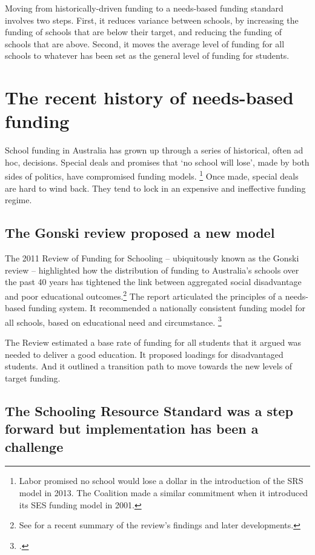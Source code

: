 \documentclass{grattan}
\begin{document}
Moving from historically-driven funding to a needs-based funding standard involves two steps.
First, it reduces variance between schools, by increasing the funding of schools that are below their target, and reducing the funding of schools that are above.
Second, it moves the average level of funding for all schools to whatever has been set as the general level of funding for students.

\section{The recent history of needs-based funding}\label{sec:politics-has-got-in-the-way-of-good-policy}

School funding in Australia has grown up through a series of historical, often ad hoc, decisions. Special deals and promises that `no school will lose', made by both sides of politics, have compromised funding models.%
\footnote{Labor promised no school would lose a dollar in the introduction of the SRS model in 2013.
The Coalition made a similar commitment when it introduced its SES funding model in 2001.}
Once made, special deals are hard to wind back.
They tend to lock in an expensive and ineffective funding regime.

\subsection{The Gonski review proposed a new model}\label{subsec:the-gonski-principles-should-be-the-goal}

The 2011 Review of Funding for Schooling -- ubiquitously known as the Gonski review -- highlighted how the distribution of funding to Australia's schools over the past 40 years has tightened the link between aggregated social disadvantage and poor educational outcomes.\footnote{See \textcite{Boston-2016-WhatGonskiReally} for a recent summary of the review's findings and later developments.}
The report articulated the principles of a needs-based funding system.
It recommended a nationally consistent funding model for all schools, based on educational need and circumstance.%
\footcite[][xxi]{Gonski2011ReviewFundingSchooling}

The Review estimated a base rate of funding for all students that it argued was needed to deliver a good education.
It proposed loadings for disadvantaged students.
And it outlined a transition path to move towards the new levels of target funding.

\subsection{The Schooling Resource Standard was a step forward but implementation has been a challenge}\label{subsec:the-schooling-resource-standard-was-a-stepforward-but-needs-review}
\end{document}
